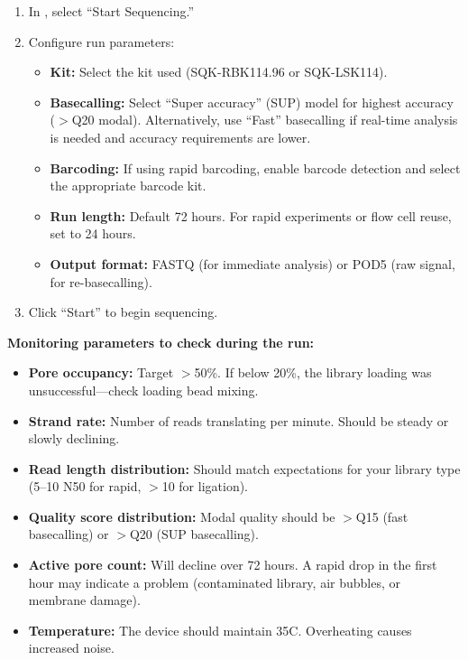 \begin{protocolbox}[title={Protocol: Starting a Sequencing Run in MinKNOW}]
\begin{enumerate}[nosep]
  \item In , select ``Start Sequencing.''
  \item Configure run parameters:
    \begin{itemize}[nosep]
      \item \textbf{Kit:} Select the kit used (SQK-RBK114.96 or SQK-LSK114).
      \item \textbf{Basecalling:} Select ``Super accuracy'' (SUP) model for highest accuracy ($>$Q20 modal). Alternatively, use ``Fast'' basecalling if real-time analysis is needed and accuracy requirements are lower.
      \item \textbf{Barcoding:} If using rapid barcoding, enable barcode detection and select the appropriate barcode kit.
      \item \textbf{Run length:} Default 72 hours. For rapid experiments or flow cell reuse, set to 24 hours.
      \item \textbf{Output format:} FASTQ (for immediate analysis) or POD5 (raw signal, for re-basecalling).
    \end{itemize}
  \item Click ``Start'' to begin sequencing.
\end{enumerate}

\textbf{Monitoring parameters to check during the run:}
\begin{itemize}[nosep]
  \item \textbf{Pore occupancy:} Target $>$50\%. If below 20\%, the library loading was unsuccessful---check loading bead mixing.
  \item \textbf{Strand rate:} Number of reads translating per minute. Should be steady or slowly declining.
  \item \textbf{Read length distribution:} Should match expectations for your library type (5--10\kilobase{} N50 for rapid, $>$10\kilobase{} for ligation).
  \item \textbf{Quality score distribution:} Modal quality should be $>$Q15 (fast basecalling) or $>$Q20 (SUP basecalling).
  \item \textbf{Active pore count:} Will decline over 72 hours. A rapid drop in the first hour may indicate a problem (contaminated library, air bubbles, or membrane damage).
  \item \textbf{Temperature:} The device should maintain 35\textdegree C. Overheating causes increased noise.
\end{itemize}
\end{protocolbox}

